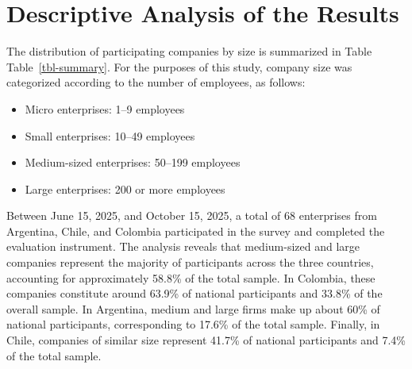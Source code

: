 \documentclass[
  12pt,
  oneside]{book}
\providecommand{\tightlist}{%
  \setlength{\itemsep}{0pt}\setlength{\parskip}{0pt}}
\begin{document}
\section{Descriptive Analysis of the
Results}\label{descriptive-analysis-of-the-results}

The distribution of participating companies by size is summarized in
Table Table~\ref{tbl-summary}. For the purposes of this study, company
size was categorized according to the number of employees, as follows:

\begin{itemize}
\tightlist
\item
  Micro enterprises: 1--9 employees
\item
  Small enterprises: 10--49 employees
\item
  Medium-sized enterprises: 50--199 employees
\item
  Large enterprises: 200 or more employees
\end{itemize}

Between June 15, 2025, and October 15, 2025, a total of 68 enterprises
from Argentina, Chile, and Colombia participated in the survey and
completed the evaluation instrument. The analysis reveals that
medium-sized and large companies represent the majority of participants
across the three countries, accounting for approximately 58.8\% of the
total sample. In Colombia, these companies constitute around 63.9\% of
national participants and 33.8\% of the overall sample. In Argentina,
medium and large firms make up about 60\% of national participants,
corresponding to 17.6\% of the total sample. Finally, in Chile,
companies of similar size represent 41.7\% of national participants and
7.4\% of the total sample.
\end{document}
